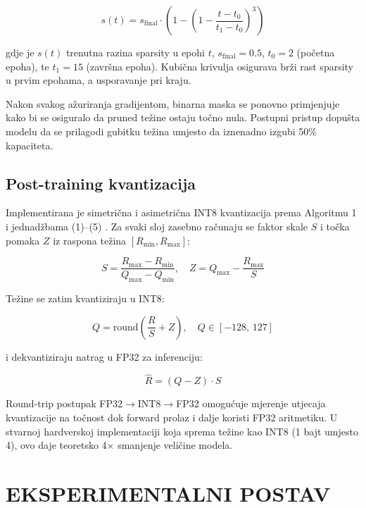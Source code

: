 \documentclass[letterpaper, 10 pt, conference]{ieeeconf}
\begin{document}
\begin{equation}
  s(t) = s_{\text{final}} \cdot \left( 1 - \left(1 - \frac{t - t_0}{t_1 - t_0}\right)^3 \right)
\end{equation}

gdje je $s(t)$ trenutna razina sparsity u epohi $t$, $s_{\text{final}}=0.5$, $t_0=2$ (početna epoha), te $t_1=15$ (završna epoha).
Kubična krivulja osigurava brži rast sparsity u prvim epohama, a usporavanje pri kraju.

Nakon svakog ažuriranja gradijentom, binarna maska se ponovno primjenjuje kako bi se osiguralo da pruned težine ostaju točno nula.
Postupni pristup dopušta modelu da se prilagodi gubitku težina umjesto da iznenadno izgubi 50\% kapaciteta.

\subsection{Post-training kvantizacija}

Implementirana je simetrična i asimetrična INT8 kvantizacija prema Algoritmu 1 i jednadžbama (1)--(5) \cite{li2023survey}.
Za svaki sloj zasebno računaju se faktor skale $S$ i točka pomaka $Z$ iz raspona težina $[R_{\min}, R_{\max}]$:

\begin{equation}
  S = \frac{R_{\max} - R_{\min}}{Q_{\max} - Q_{\min}}, \quad
  Z = Q_{\max} - \frac{R_{\max}}{S}
\end{equation}

Težine se zatim kvantiziraju u INT8:

\begin{equation}
  Q = \mathrm{round}\!\left(\frac{R}{S} + Z\right), \quad Q \in [-128,\,127]
\end{equation}

i dekvantiziraju natrag u FP32 za inferenciju:

\begin{equation}
  \hat{R} = (Q - Z) \cdot S
\end{equation}

Round-trip postupak FP32$\rightarrow$INT8$\rightarrow$FP32 omogućuje mjerenje utjecaja kvantizacije na točnost dok forward prolaz i dalje koristi FP32 aritmetiku.
U stvarnoj hardverskoj implementaciji koja sprema težine kao INT8 (1 bajt umjesto 4), ovo daje teoretsko 4$\times$ smanjenje veličine modela.

\section{\textbf{EKSPERIMENTALNI POSTAV}}
\end{document}
